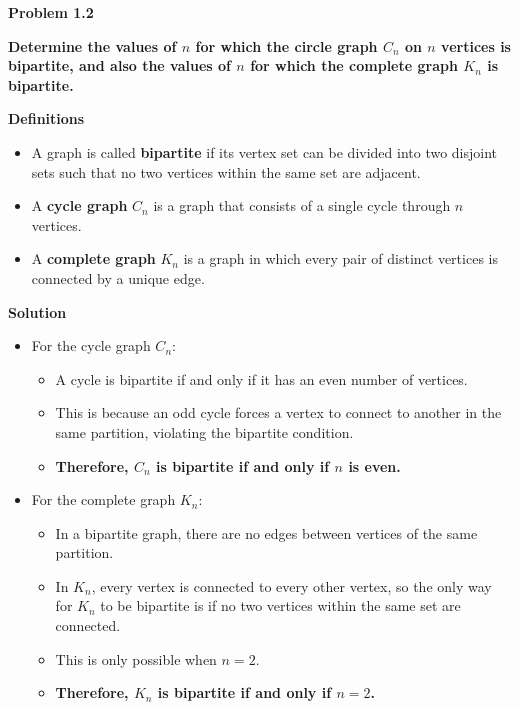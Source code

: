 \documentclass{article}
\begin{document}
\textbf{Problem 1.2}

\textbf{Determine the values of $n$ for which the circle graph $C_n$ on $n$ vertices is bipartite, and also the values of $n$ for which the complete graph $K_n$ is bipartite.}

\textbf{Definitions}

\begin{itemize}
    \item A graph is called \textbf{bipartite} if its vertex set can be divided into two disjoint sets such that no two vertices within the same set are adjacent.
    \item A \textbf{cycle graph} $C_n$ is a graph that consists of a single cycle through $n$ vertices.
    \item A \textbf{complete graph} $K_n$ is a graph in which every pair of distinct vertices is connected by a unique edge.
\end{itemize}

\textbf{Solution}

\begin{itemize}
    \item For the cycle graph $C_n$:
    \begin{itemize}
        \item A cycle is bipartite if and only if it has an even number of vertices.
        \item This is because an odd cycle forces a vertex to connect to another in the same partition, violating the bipartite condition.
        \item \textbf{Therefore, $C_n$ is bipartite if and only if $n$ is even.}
    \end{itemize}
    
    \item For the complete graph $K_n$:
    \begin{itemize}
        \item In a bipartite graph, there are no edges between vertices of the same partition.
        \item In $K_n$, every vertex is connected to every other vertex, so the only way for $K_n$ to be bipartite is if no two vertices within the same set are connected.
        \item This is only possible when $n = 2$.
        \item \textbf{Therefore, $K_n$ is bipartite if and only if $n = 2$.}
    \end{itemize}
\end{itemize}
\end{document}
